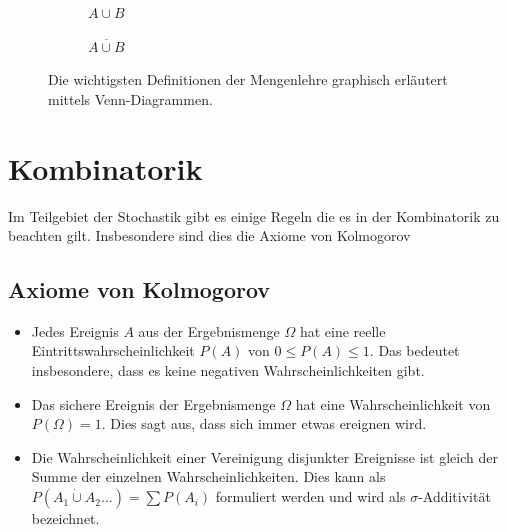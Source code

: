 \begin{figure}[h!]
	\rule[1mm]{0mm}{5mm}

	\begin{subfigure}[b]{0.45\textwidth}
		\centering
		\begin{venndiagram2sets}[tikzoptions={scale=0.7}]
			\fillA \fillB
		\end{venndiagram2sets}
		\caption{$A \cup B$}
	\end{subfigure}	
	\begin{subfigure}[b]{0.45\textwidth}
		\centering
		\begin{venndiagram2sets}[tikzoptions={scale=0.7}]
			\fillNotAorB
		\end{venndiagram2sets}
		\caption{$\overline{A \cup B}$}
	\end{subfigure}
	\caption{Die wichtigsten Definitionen der Mengenlehre graphisch
	erläutert mittels Venn-Diagrammen.}
\end{figure}

\section{Kombinatorik}
Im Teilgebiet der Stochastik gibt es einige Regeln die es in der 
Kombinatorik zu beachten gilt. Insbesondere sind dies die Axiome von
Kolmogorov

\subsection{Axiome von Kolmogorov}
\begin{itemize}
	\item Jedes Ereignis $A$ aus der Ergebnismenge $\Omega$ hat eine 
		reelle Eintrittswahrscheinlichkeit $P(A)$ von 
		$0 \leq P(A) \leq 1$. Das bedeutet insbesondere, dass es 
		keine negativen Wahrscheinlichkeiten gibt.
	\item Das sichere Ereignis der Ergebnismenge $\Omega$ hat eine
		Wahrscheinlichkeit von $P(\Omega)=1$. Dies sagt aus, dass
		sich immer etwas ereignen wird.
	\item Die Wahrscheinlichkeit einer Vereinigung disjunkter 
		Ereignisse ist gleich der Summe der einzelnen 
		Wahrscheinlichkeiten. Dies kann als 
		$P(A_1 \dot\cup A_2  \dots ) = \sum P(A_i)$ 
		formuliert werden und wird als $\sigma$-Additivität
		bezeichnet.
\end{itemize}

